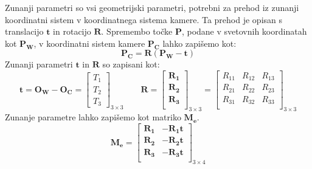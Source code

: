 Zunanji parametri so vsi geometrijski parametri, potrebni za prehod iz zunanji koordinatni sistem v koordinatnega sistema kamere. Ta prehod je opisan s translacijo $\pmb{t}$ in rotacijo $\pmb{R}$. Spremembo točke $\pmb{P}$, podane v svetovnih koordinatah kot $\pmb{P_W}$, v koordinatni sistem kamere $\pmb{P_C}$ lahko zapišemo kot:
\[
    \pmb{P_C} = \pmb{R}(\pmb{P_W}-\pmb{t})
\]
Zunanji parametri $\pmb{t}$ in $\pmb{R}$ so zapisani kot:
\[
    \pmb{t} = \pmb{O_W} - \pmb{O_C} = \begin{bmatrix}
                                        T_1 \\
                                        T_2 \\
                                        T_3
                                        \end{bmatrix}_{3\times3}
                                        \qquad
    \pmb{R} =
    \begin{bmatrix}
        \pmb{R_{1}} \\
        \pmb{R_{2}} \\
        \pmb{R_{3}} \\
    \end{bmatrix}_{3\times3}
    = \begin{bmatrix}
        R_{11} & R_{12} & R_{13} \\
        R_{21} & R_{22} & R_{23} \\
        R_{31} & R_{32} & R_{33} \\
    \end{bmatrix}_{3\times3}
\]
Zunanje parametre lahko zapišemo kot matriko $\pmb{M_e}$.
\[
    \pmb{M_e} = 
    \begin{bmatrix}
        \pmb{R_1} & -\pmb{R_1 t} \\
        \pmb{R_2} & -\pmb{R_2 t} \\
        \pmb{R_3} & -\pmb{R_3 t} \\        
    \end{bmatrix}_{3\times4}
\]